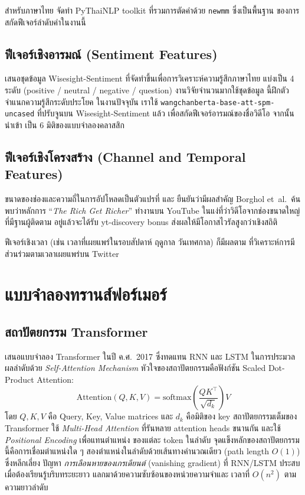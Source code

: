 สำหรับภาษาไทย \textcite{phatthiyaphaibun2016thainlp}
จัดทำ PyThaiNLP toolkit ที่รวมการตัดคำด้วย \texttt{newmm} ซึ่งเป็นพื้นฐาน
ของการสกัดฟีเจอร์ลำดับคำในงานนี้

\subsection{ฟีเจอร์เชิงอารมณ์ (Sentiment Features)}

\textcite{suriyawongkul2019wisesight} เสนอชุดข้อมูล
Wisesight-Sentiment ที่จัดทำขึ้นเพื่อการวิเคราะห์ความรู้สึกภาษาไทย แบ่งเป็น
4 ระดับ (positive / neutral / negative / question) งานวิจัยจำนวนมากใช้ชุดข้อมูล
นี้ฝึกตัวจำแนกความรู้สึกระดับประโยค \cite{lowphansirikul2021wangchanberta}
ในงานปัจจุบัน เราใช้ \texttt{wangchanberta-base-att-spm-uncased} ที่ปรับจูนบน
Wisesight-Sentiment แล้ว เพื่อสกัดฟีเจอร์อารมณ์ของชื่อวิดีโอ จากนั้นนำเข้า
เป็น 6 มิติของแบบจำลองคลาสสิก

\subsection{ฟีเจอร์เชิงโครงสร้าง (Channel and Temporal Features)}

ขนาดของช่องและความถี่ในการอัปโหลดเป็นตัวแปรที่ \textcite{hoiles2017engagement} และ \textcite{borghol2012untold}
ยืนยันว่ามีผลสำคัญ Borghol et~al.\ ค้นพบว่าหลักการ ``\textit{The Rich Get
Richer}'' ทำงานบน YouTube ในแง่ที่ว่าวิดีโอจากช่องขนาดใหญ่ที่มีฐานผู้ติดตาม
อยู่แล้วจะได้รับ yt-discovery bonus ส่งผลให้มีโอกาสไวรัลสูงกว่าเชิงสถิติ

ฟีเจอร์เชิงเวลา (เช่น เวลาที่เผยแพร่ในรอบสัปดาห์ ฤดูกาล วันเทศกาล) ก็มีผลตาม
\textcite{wu2016unfolding} ที่วิเคราะห์การมีส่วนร่วมตามเวลาเผยแพร่บน
Twitter

\section{แบบจำลองทรานส์ฟอร์เมอร์}
\label{sec:lit-transformer}

\subsection{สถาปัตยกรรม Transformer}

\textbf{\textcite{vaswani2017attention}} เสนอแบบจำลอง Transformer
ในปี ค.ศ.\ 2017 ซึ่งทดแทน RNN และ LSTM ในการประมวลผลลำดับด้วย
\emph{Self-Attention Mechanism} หัวใจของสถาปัตยกรรมคือฟังก์ชัน Scaled
Dot-Product Attention:
\begin{equation}
\mathrm{Attention}(Q, K, V) = \mathrm{softmax}\!\left(\frac{Q K^{\top}}{\sqrt{d_k}}\right) V
\label{eq:attention}
\end{equation}
โดย $Q, K, V$ คือ Query, Key, Value matrices และ $d_k$ คือมิติของ key
สถาปัตยกรรมเต็มของ Transformer ใช้ \emph{Multi-Head Attention} ที่รันหลาย
attention heads ขนานกัน และใช้ \emph{Positional Encoding} เพื่อแทนตำแหน่ง
ของแต่ละ token ในลำดับ จุดแข็งหลักของสถาปัตยกรรมนี้คือการเชื่อมตำแหน่งใด ๆ
สองตำแหน่งในลำดับด้วยเส้นทางคำนวณเดียว (path length $O(1)$) ซึ่งหลีกเลี่ยง
ปัญหา \emph{การเลือนหายของเกรเดียนต์} (vanishing gradient) ที่ RNN/LSTM
ประสบเมื่อต้องเรียนรู้บริบทระยะยาว แลกมาด้วยความซับซ้อนของหน่วยความจำและ
เวลาที่ $O(n^2)$ ตามความยาวลำดับ

